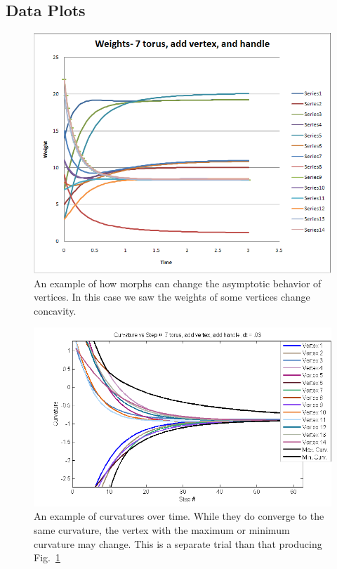 \documentclass[12pt]{article}
\begin{document}
\subsection{Data Plots}
\label{dataplots}

\begin{figure}[h]
\begin{center}
\includegraphics[scale = 0.65]{Pictures/torus7addvaddhweights2.png}
\caption{An example of how morphs can change the asymptotic behavior of vertices. In this case we saw the weights of some vertices change concavity.}
\label{fig:t7vh}
\end{center}
\end{figure}

\begin{figure}
\begin{center}
\includegraphics[scale = 0.8]{Pictures/curvcurves.png}
\caption{An example of curvatures over time. While they do converge to the same curvature, the vertex with the maximum or minimum curvature may change. This is a separate trial than that producing Fig.~\ref{fig:t7vh}}
\end{center}
\end{figure}
\end{document}
